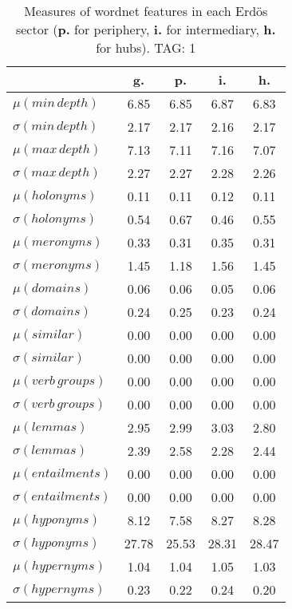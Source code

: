\begin{table}[h!]
\begin{center}
\begin{tabular}{| l | c | c | c | c |}\hline
 & g. & p. & i. & h. \\\hline
$\mu(min\,depth)$ & 6.85  & 6.85  & 6.87  & 6.83 \\\hline
$\sigma(min\,depth)$ & 2.17  & 2.17  & 2.16  & 2.17 \\\hline
$\mu(max\,depth)$ & 7.13  & 7.11  & 7.16  & 7.07 \\\hline
$\sigma(max\,depth)$ & 2.27  & 2.27  & 2.28  & 2.26 \\\hline
$\mu(holonyms)$ & 0.11  & 0.11  & 0.12  & 0.11 \\\hline
$\sigma(holonyms)$ & 0.54  & 0.67  & 0.46  & 0.55 \\\hline
$\mu(meronyms)$ & 0.33  & 0.31  & 0.35  & 0.31 \\\hline
$\sigma(meronyms)$ & 1.45  & 1.18  & 1.56  & 1.45 \\\hline
$\mu(domains)$ & 0.06  & 0.06  & 0.05  & 0.06 \\\hline
$\sigma(domains)$ & 0.24  & 0.25  & 0.23  & 0.24 \\\hline
$\mu(similar)$ & 0.00  & 0.00  & 0.00  & 0.00 \\\hline
$\sigma(similar)$ & 0.00  & 0.00  & 0.00  & 0.00 \\\hline
$\mu(verb\,groups)$ & 0.00  & 0.00  & 0.00  & 0.00 \\\hline
$\sigma(verb\,groups)$ & 0.00  & 0.00  & 0.00  & 0.00 \\\hline
$\mu(lemmas)$ & 2.95  & 2.99  & 3.03  & 2.80 \\\hline
$\sigma(lemmas)$ & 2.39  & 2.58  & 2.28  & 2.44 \\\hline
$\mu(entailments)$ & 0.00  & 0.00  & 0.00  & 0.00 \\\hline
$\sigma(entailments)$ & 0.00  & 0.00  & 0.00  & 0.00 \\\hline
$\mu(hyponyms)$ & 8.12  & 7.58  & 8.27  & 8.28 \\\hline
$\sigma(hyponyms)$ & 27.78  & 25.53  & 28.31  & 28.47 \\\hline
$\mu(hypernyms)$ & 1.04  & 1.04  & 1.05  & 1.03 \\\hline
$\sigma(hypernyms)$ & 0.23  & 0.22  & 0.24  & 0.20 \\\hline
\end{tabular}
\caption{Measures of wordnet features in each Erd\"os sector ({{\bf p.}} for periphery, {{\bf i.}} for intermediary, {{\bf h.}} for hubs). TAG: 1}
\end{center}
\end{table}